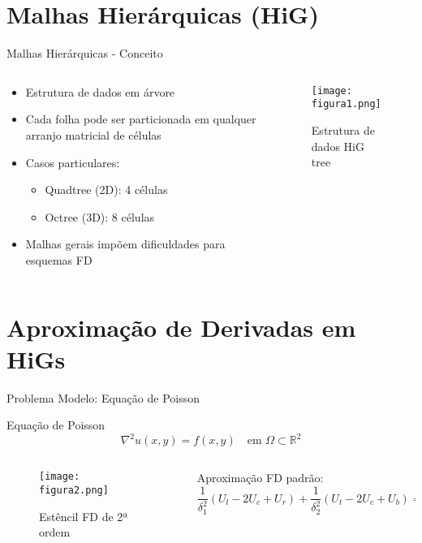 \documentclass[../main/main.tex]{subfiles}
\begin{document}
\section{Malhas Hierárquicas (HiG)}

\begin{frame}{Malhas Hierárquicas - Conceito}
\begin{columns}[T]
\begin{column}{0.5\textwidth}
\begin{itemize}
\item Estrutura de dados em árvore
\item Cada folha pode ser particionada em qualquer arranjo matricial de células
\item Casos particulares:
\begin{itemize}
\item Quadtree (2D): 4 células
\item Octree (3D): 8 células
\end{itemize}
\item Malhas gerais impõem dificuldades para esquemas FD
\end{itemize}
\end{column}
\begin{column}{0.5\textwidth}
\begin{figure}
\centering
\texttt{[image: figura1.png]}
\caption{Estrutura de dados HiG tree}
\end{figure}
\end{column}
\end{columns}
\end{frame}

\section{Aproximação de Derivadas em HiGs}

\begin{frame}{Problema Modelo: Equação de Poisson}
\begin{block}{Equação de Poisson}
\[
\nabla^2 u(x, y) = f(x, y) \quad \text{em } \Omega \subset \mathbb{R}^2
\]
\end{block}

\begin{columns}[T]
\begin{column}{0.5\textwidth}
\begin{figure}
\centering
\texttt{[image: figura2.png]}
\caption{Estêncil FD de 2ª ordem}
\end{figure}
\end{column}
\begin{column}{0.5\textwidth}
Aproximação FD padrão:
\[
\frac{1}{\delta_1^2}(U_l - 2U_c + U_r) + \frac{1}{\delta_2^2}(U_t - 2U_c + U_b) = f_c
\]
\end{column}
\end{columns}
\end{frame}
\end{document}
